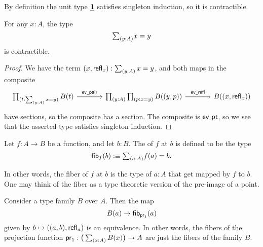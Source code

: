 \begin{eg}
By definition the unit type $\underline{\mathbf{1}}$ satisfies singleton induction, so it is contractible.
\end{eg}

\begin{prp}\label{thm:total_path}
For any $x:A$, the type
\begin{equation*}
\sm{y:A}x=y
\end{equation*}
is contractible.
\end{prp}

\begin{proof}
We have the term $(x,\refl{x}):\sm{y:A}x=y$, and both maps in the composite
\begin{equation*}
\begin{tikzcd}[column sep=large]
\prd{t:\sm{y:A}x=y}B(t) \arrow[r,"\mathsf{ev\usc{}pair}"] & \prd{y:A}{p:x=y}B((y,p)) \arrow[r,"\mathsf{ev\usc{}refl}"] & B((x,\refl{x}))
\end{tikzcd}
\end{equation*}
have sections, so the composite has a section. The composite is $\mathsf{ev\underline{\ }{}pt}$, so we see that the asserted type satisfies singleton induction.
\end{proof}

\begin{defn}
Let $f:A\to B$ be a function, and let $b:B$. The  of $f$ at $b$ is defined to be the type
\begin{equation*}
\fib{f}{b}\defeq\sm{a:A}f(a)=b.
\end{equation*}
\end{defn}

In other words, the fiber of $f$ at $b$ is the type of $a:A$ that get mapped by $f$ to $b$.
One may think of the fiber as a type theoretic version of the pre-image of a point.

\begin{eg}\label{eg:fib_proj}
Consider a type family $B$ over $A$. Then the map
\begin{equation*}
B(a)\to \mathsf{fib}_{\mathsf{pr}_{1}}(a)
\end{equation*}
given by $b\mapsto ((a,b),\mathsf{refl}_{a})$ is an equivalence. In other words, the fibers of the projection function $\proj 1 : \big(\sm{x:A}B(x)\big)\to A$ are just the fibers of the family $B$.
\end{eg}

